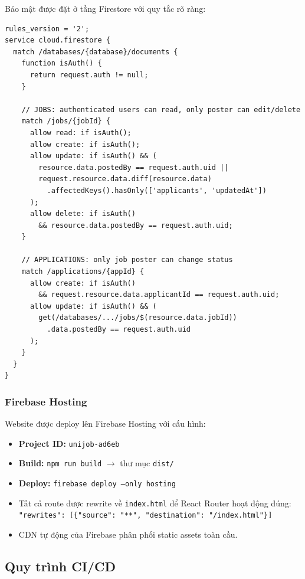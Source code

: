 Bảo mật được đặt ở tầng Firestore với quy tắc rõ ràng:

\begin{lstlisting}[language={}, caption={Firestore Security Rules (excerpt)}]
rules_version = '2';
service cloud.firestore {
  match /databases/{database}/documents {
    function isAuth() {
      return request.auth != null;
    }

    // JOBS: authenticated users can read, only poster can edit/delete
    match /jobs/{jobId} {
      allow read: if isAuth();
      allow create: if isAuth();
      allow update: if isAuth() && (
        resource.data.postedBy == request.auth.uid ||
        request.resource.data.diff(resource.data)
          .affectedKeys().hasOnly(['applicants', 'updatedAt'])
      );
      allow delete: if isAuth()
        && resource.data.postedBy == request.auth.uid;
    }

    // APPLICATIONS: only job poster can change status
    match /applications/{appId} {
      allow create: if isAuth()
        && request.resource.data.applicantId == request.auth.uid;
      allow update: if isAuth() && (
        get(/databases/.../jobs/$(resource.data.jobId))
          .data.postedBy == request.auth.uid
      );
    }
  }
}
\end{lstlisting}

\subsubsection{Firebase Hosting}

Website được deploy lên Firebase Hosting với cấu hình:
\begin{itemize}
  \item \textbf{Project ID:} \texttt{unijob-ad6eb}
  \item \textbf{Build:} \texttt{npm run build} $\rightarrow$ thư mục \texttt{dist/}
  \item \textbf{Deploy:} \texttt{firebase deploy --only hosting}
  \item Tất cả route được rewrite về \texttt{index.html} để React Router hoạt động đúng:
    \texttt{"rewrites": [\{"source": "**", "destination": "/index.html"\}]}
  \item CDN tự động của Firebase phân phối static assets toàn cầu.
\end{itemize}

\subsection{Quy trình CI/CD}

